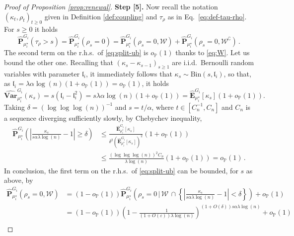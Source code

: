 \documentclass[11pt,oneside]{amsart}
\numberwithin{equation}{section}  %
\theoremstyle{plain}
\newcommand{\iid}{{i.i.d.~}}
\newcommand{\rhs}{{r.h.s.~}}
\newcommand{\p}{\mathbb{P}}
\newcommand{\op}{o_{\p}}
\newcommand{\bin}{\text{Bin}}
\newcommand{\quench}{\mathbf{P}}
\newcommand{\Equench}{\mathbf{E}}
\newcommand{\muqs}{\mu^\star_i}
\begin{document}
\begin{proof}[Proof of Proposition \ref{prop:renewal}]
{\bf Step [5].} Now recall the notation $(\kappa_t,\rho_t)_{t\ge 0}$ given in Definition \ref{def:coupling} and $\tau_\rho$ as in Eq.~\eqref{eq:def-tau-rho}. 
For $s \ge 0$ it holds
    \begin{equation}\label{eq:split-ub} 
		\hat{\quench}^{G_i}_{\muqs}(\tau_\rho> s)=\hat{\quench}^{G_i}_{\muqs}(\rho_s=0)= \hat{\quench}^{G_i}_{\muqs}(\rho_s=0,\mathcal{W})+	\hat{\quench}^{G_i}_{\muqs}(\rho_s=0,\mathcal{W}^\complement)\,.
	\end{equation}
	The second term on the \rhs of \eqref{eq:split-ub} is $\op(1)$ thanks to \eqref{eq:W}. Let us bound the other one.
    Recalling that $(\kappa_s-\kappa_{s-1})_{s\ge 1}$ are \iid Bernoulli random variables with parameter $\mathfrak{l}_i$, it immediately follows that $\kappa_s\sim \bin(s,\mathfrak{l}_i)$,
    so that, as $\mathfrak{l}_i=\lambda\alpha\log(n)(1+\op(1))=\op(1)$, it holds $$\hat{\mathbf{Var}}^{G_i}_{\muqs}(\kappa_s)
    =s(\mathfrak{l}_i-\mathfrak{l}_i^2)
    =s\lambda\alpha\log(n)(1+\op(1))
    =  \hat{\Equench}^{G_i}_{\muqs}[\kappa_s](1+\op(1)).$$
    Taking $\delta=(\log\log\log(n))^{-1}$ and 
    $s = t/\alpha$, where $t \in \left[ C_n^{-1},{C_n}\right] $ and $C_n$ is a sequence diverging sufficiently slowly,
    by Chebychev inequality, %
	\begin{equation}
    \begin{split}
    \hat{\quench}^{G_i}_{\muqs}\left(\left|\frac{\kappa_s}{{s}{\alpha\lambda\log(n)}}-1\right|\ge \delta\right)
    &\le\frac{\hat{\Equench}^{G_i}_{\muqs}[\kappa_s]}{\delta^2 (\hat{\Equench}^{G_i}_{\muqs}[\kappa_s])^2}(1+\op(1))\\
    &\le \frac{(\log\log\log(n))^2C_n}{\lambda\log(n)}(1+\op(1))=\op(1)\,.
    \end{split}
    \end{equation}
    In conclusion, the first term on the \rhs of \eqref{eq:split-ub} can be bounded, for $s$ as above, by
\begin{equation}
		\begin{split}
			\hat{\quench}^{G_i}_{\muqs}(\rho_s=0,\mathcal{W})
			&= (1-\op(1))\hat{\quench}^{G_i}_{\muqs}\left(\rho_s=0\,\bigg\vert\,\mathcal{W}\,\cap\left\{ \left|\frac{\kappa_s}{{s}{\alpha\lambda\log(n)}}-1\right|<\delta\right\} \right)+\op(1)\\
			&=(1-\op(1))\left(1-\frac{1}{(1+O(\varepsilon))\lambda\log(n)}\right)^{(1+O(\delta))s\alpha\lambda\log(n)}+\op(1)\\

\end{split}
\end{equation}
\end{proof}
\end{document}
